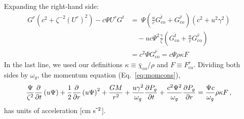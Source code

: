 \documentclass[../main.tex]{subfiles}
\begin{document}
Expanding the right-hand side:
\begin{align*}
    G^r(c^2+\zeta^{-2}(U^r)^2)-c\Psi U^rG^t
    &=\;\Psi\left(\frac{u}{c}G^{\hat{t}}_\text{co}+G^{\hat{r}}_\text{co}\right)\left(c^2+u^2\gamma^2\right)\\
    &\quad-uc\Psi^2\frac{\gamma}{\zeta}\left(G^{\hat{t}}_\text{co}+\frac{u}{c}G^{\hat{r}}_\text{co}\right)\\
    & =c^2\Psi G^{\hat{r}}_\text{co}=c\Psi\rho\kappa F
\end{align*}
In the last line, we used our definitions $\kappa\equiv\bar{\chi}_\text{co}/\rho$ and $F\equiv F^r_\text{co}$. Dividing both sides by $\omega_g$, the momentum equation (Eq.~\ref{eq:momcons}),
\begin{equation}
\frac{\Psi}{\zeta^2}\frac{\partial}{\partial t}\left(u \Psi\right)+\frac{1}{2}\frac{\partial}{\partial r}\left(u\Psi\right)^2+\frac{GM}{r^2} +\frac{u\gamma^2}{\omega_g}\frac{\partial P_g}{\partial t} +\frac{c^2\Psi^2}{\omega_g}\frac{\partial P_g}{\partial r} = \frac{\Psi c}{\omega_g}\rho\kappa F\,,
\end{equation}
has units of acceleration [cm s$^{\-2}$].
\end{document}
